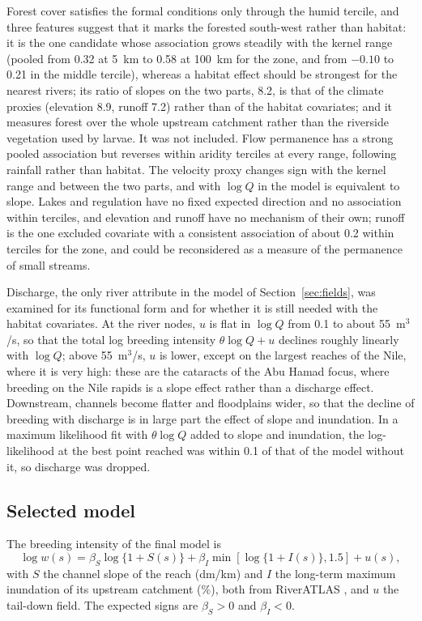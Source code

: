 \documentclass[11pt,a4paper]{article}
\begin{document}
Forest cover satisfies the formal conditions only through the humid tercile, and three features suggest that it marks the forested south-west rather than habitat: it is the one candidate whose association grows steadily with the kernel range (pooled from 0.32 at 5~km to 0.58 at 100~km for the zone, and from $-0.10$ to 0.21 in the middle tercile), whereas a habitat effect should be strongest for the nearest rivers; its ratio of slopes on the two parts, 8.2, is that of the climate proxies (elevation 8.9, runoff 7.2) rather than of the habitat covariates; and it measures forest over the whole upstream catchment rather than the riverside vegetation used by larvae. It was not included. Flow permanence has a strong pooled association but reverses within aridity terciles at every range, following rainfall rather than habitat. The velocity proxy changes sign with the kernel range and between the two parts, and with $\log Q$ in the model is equivalent to slope. Lakes and regulation have no fixed expected direction and no association within terciles, and elevation and runoff have no mechanism of their own; runoff is the one excluded covariate with a consistent association of about 0.2 within terciles for the zone, and could be reconsidered as a measure of the permanence of small streams.

Discharge, the only river attribute in the model of Section~\ref{sec:fields}, was examined for its functional form and for whether it is still needed with the habitat covariates. At the river nodes, $u$ is flat in $\log Q$ from 0.1 to about 55~m$^3$/s, so that the total log breeding intensity $\theta\log Q + u$ declines roughly linearly with $\log Q$; above 55~m$^3$/s, $u$ is lower, except on the largest reaches of the Nile, where it is very high: these are the cataracts of the Abu Hamad focus, where breeding on the Nile rapids is a slope effect rather than a discharge effect. Downstream, channels become flatter and floodplains wider, so that the decline of breeding with discharge is in large part the effect of slope and inundation. In a maximum likelihood fit with $\theta\log Q$ added to slope and inundation, the log-likelihood at the best point reached was within 0.1 of that of the model without it, so discharge was dropped.

\subsection*{Selected model}

The breeding intensity of the final model is
\[
\log w(s) = \beta_S \log\{1 + S(s)\} + \beta_I \min[\log\{1 + I(s)\}, 1.5] + u(s),
\]
with $S$ the channel slope of the reach (dm/km) and $I$ the long-term maximum inundation of its upstream catchment (\%), both from RiverATLAS \citep{linke2019}, and $u$ the tail-down field. The expected signs are $\beta_S > 0$ and $\beta_I < 0$.
\end{document}
